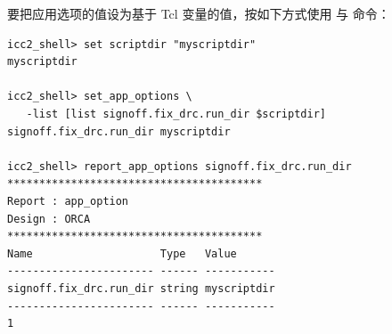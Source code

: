 要把应用选项的值设为基于 Tcl 变量的值，按如下方式使用  与  命令：
\begin{lstlisting}
icc2_shell> set scriptdir "myscriptdir"
myscriptdir

icc2_shell> set_app_options \
   -list [list signoff.fix_drc.run_dir $scriptdir]
signoff.fix_drc.run_dir myscriptdir

icc2_shell> report_app_options signoff.fix_drc.run_dir
****************************************
Report : app_option
Design : ORCA
****************************************
Name                    Type   Value
----------------------- ------ -----------
signoff.fix_drc.run_dir string myscriptdir
----------------------- ------ -----------
1
\end{lstlisting}
